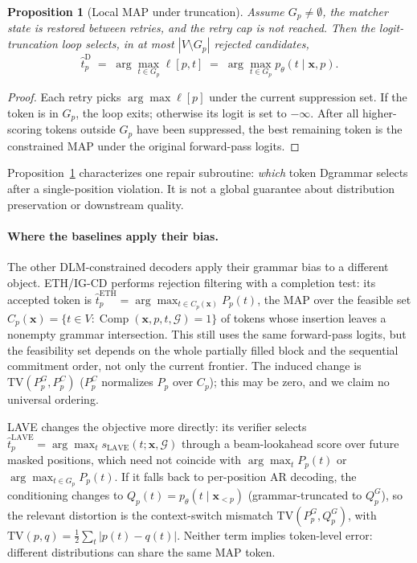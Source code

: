 \documentclass[11pt]{article}
\newtheorem{proposition}{Proposition}
\begin{document}
\begin{proposition}[Local MAP under truncation]
\label{prop:trunc}
Assume $G_p\neq\emptyset$, the matcher state is restored between retries, and the retry cap is not reached. Then the logit-truncation loop selects, in at most $|V \setminus G_p|$ rejected candidates,
\[
\hat{t}_p^{\text{D}} \;=\; \arg\max_{t \in G_p} \ell[p,t] \;=\; \arg\max_{t \in G_p} p_\theta(t \mid \mathbf{x}, p).
\]
\end{proposition}
\begin{proof}
Each retry picks $\arg\max \ell[p]$ under the current suppression set. If the token is in $G_p$, the loop exits; otherwise its logit is set to $-\infty$. After all higher-scoring tokens outside $G_p$ have been suppressed, the best remaining token is the constrained MAP under the original forward-pass logits.
\end{proof}

Proposition~\ref{prop:trunc} characterizes one repair subroutine: \emph{which} token Dgrammar selects after a single-position violation. It is not a global guarantee about distribution preservation or downstream quality.

\paragraph{Where the baselines apply their bias.} The other DLM-constrained decoders apply their grammar bias to a different object. ETH/IG-CD performs rejection filtering with a completion test: its accepted token is $\hat{t}_p^{\text{ETH}}=\arg\max_{t\in C_p(\mathbf{x})} P_p(t)$, the MAP over the feasible set $C_p(\mathbf{x})=\{t\in V:\operatorname{Comp}(\mathbf{x},p,t,\mathcal{G})=1\}$ of tokens whose insertion leaves a nonempty grammar intersection. This still uses the same forward-pass logits, but the feasibility set depends on the whole partially filled block and the sequential commitment order, not only the current frontier. The induced change is $\mathrm{TV}(P_p^G,P_p^C)$ ($P_p^C$ normalizes $P_p$ over $C_p$); this may be zero, and we claim no universal ordering.

LAVE changes the objective more directly: its verifier selects $\hat{t}_p^{\text{LAVE}}=\arg\max_t s_{\text{LAVE}}(t;\mathbf{x},\mathcal{G})$ through a beam-lookahead score over future masked positions, which need not coincide with $\arg\max_t P_p(t)$ or $\arg\max_{t\in G_p}P_p(t)$. If it falls back to per-position AR decoding, the conditioning changes to $Q_p(t)=p_\theta(t\mid \mathbf{x}_{<p})$ (grammar-truncated to $Q_p^G$), so the relevant distortion is the context-switch mismatch $\mathrm{TV}(P_p^G,Q_p^G)$, with $\mathrm{TV}(p,q)=\tfrac{1}{2}\sum_t |p(t)-q(t)|$. Neither term implies token-level error: different distributions can share the same MAP token.
\end{document}
